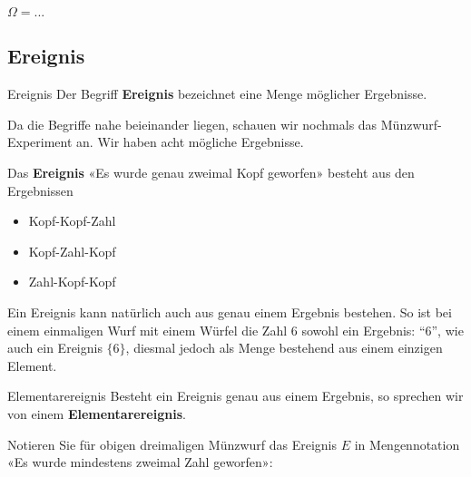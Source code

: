 $\Omega=...$



\subsection{Ereignis}
\begin{definition}{Ereignis}{}
Der Begriff \textbf{Ereignis} bezeichnet eine Menge möglicher
Ergebnisse.
\end{definition}

Da die Begriffe nahe beieinander liegen, schauen wir
nochmals das Münzwurf-Experiment an. Wir haben acht mögliche
Ergebnisse. 

Das \textbf{Ereignis} «Es wurde genau zweimal Kopf geworfen» besteht
aus den Ergebnissen

\begin{itemize}
\item Kopf-Kopf-Zahl
\item Kopf-Zahl-Kopf
\item Zahl-Kopf-Kopf
\end{itemize}

\begin{bemerkung}{}{}
  Ein Ereignis kann natürlich auch aus genau einem Ergebnis bestehen. So ist bei einem einmaligen Wurf mit einem Würfel die Zahl 6 sowohl ein Ergebnis: ``6'', wie auch ein Ereignis $\{6\}$, diesmal jedoch als Menge bestehend aus einem einzigen Element. 
  \end{bemerkung}

\begin{definition}{Elementarereignis}{}
Besteht ein Ereignis genau aus einem Ergebnis, so sprechen wir von einem \textbf{Elementarereignis}.
\end{definition}

Notieren Sie für obigen dreimaligen Münzwurf das Ereignis $E$ in Mengennotation «Es wurde mindestens
zweimal Zahl geworfen»:

